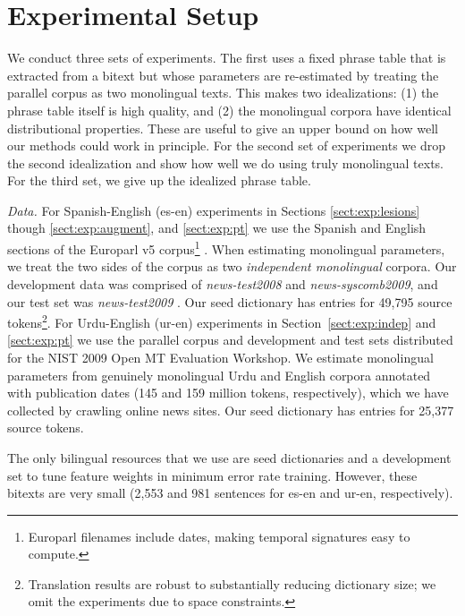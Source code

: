 \documentclass[11pt]{article}
\newcommand{\secref}[1]{Section~\ref{#1}}
\newcommand{\paraheader}[1]{\vskip 0.05in \noindent\emph{#1}}
\begin{document}
\section{Experimental Setup} \label{sect:expsetup}

We conduct three sets of experiments. The first uses a fixed phrase table that is extracted from a bitext but whose parameters are re-estimated by treating the parallel corpus as two monolingual texts. This makes two idealizations: (1) the phrase table itself is high quality, and (2) the monolingual corpora have identical distributional properties. These are useful to give an upper bound on how well our methods could work in principle. For the second set of experiments we drop the second idealization and show how well we do using truly monolingual texts. For the third set, we give up the idealized phrase table.

\paraheader{Data.} For Spanish-English (es-en) experiments in Sections \ref{sect:exp:lesions} though \ref{sect:exp:augment}, and \ref{sect:exp:pt} we use the Spanish and English sections of the Europarl v5 corpus\footnote{Europarl filenames include dates, making temporal signatures easy to compute.} \cite{Koehn:2005}. When estimating monolingual parameters, we treat the two sides of the corpus as two {\em independent monolingual} corpora.  Our development data was comprised of {\em news-test2008} and {\em news-syscomb2009}, and our test set was {\em news-test2009} \cite{callisonburch-EtAl:2010:WMT}.  Our seed dictionary has entries for 49,795 source tokens\footnote{Translation results are robust to substantially reducing dictionary size; we omit the experiments due to space constraints.}.
For Urdu-English (ur-en) experiments in \secref{sect:exp:indep} and  \ref{sect:exp:pt} we use the parallel corpus and development and test sets distributed for the NIST 2009 Open MT Evaluation Workshop.  We estimate monolingual parameters from genuinely monolingual Urdu and English corpora annotated with publication dates (145 and 159 million tokens, respectively), which we have collected by crawling online news sites.  %
Our seed dictionary has entries for 25,377 source tokens.

The only bilingual resources that we use are seed dictionaries and a development set to tune feature weights in minimum error rate training.  However, these bitexts are very small (2,553 and 981 sentences for es-en and ur-en, respectively).  
\end{document}
